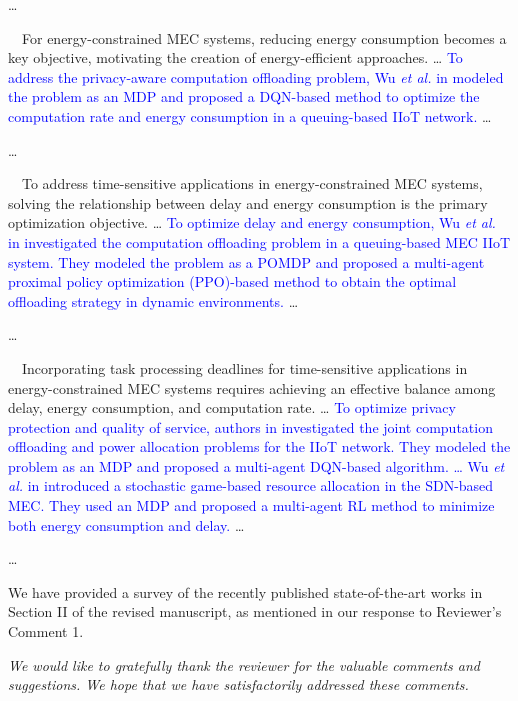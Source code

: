 \documentclass[12pt,draftclsnofoot,onecolumn]{IEEEtran}
\newcommand{\rev}[1]{{\color{blue}#1}} %
\newcommand{\rev}[1]{#1}
\newenvironment{my}[2]%
{\begin{list}{}%
{\setlength{\rightmargin}{#1}\setlength{\leftmargin}{#2}}%


 \item[]{}

} {\end{list}}
\begin{document}
\begin{enumerate}
	\begin{my}{1cm}{1cm}
		\rev{
			{
				\color{black}
				
				
				
				\dots
				
				\,\,\,\,
				For energy-constrained MEC systems, reducing energy consumption becomes a key objective, motivating the creation of energy-efficient approaches. \dots
				\textcolor{blue}{To address the privacy-aware computation offloading problem, Wu \textit{et al.} in \cite{wu2024combining} modeled the problem as an MDP and proposed a DQN-based method to optimize the computation rate and energy consumption in a queuing-based IIoT network.} \dots
				
				\dots
				
				\,\,\,\,
				To address time-sensitive applications in energy-constrained MEC systems, solving the relationship between delay and energy consumption is the primary optimization objective.  \dots
					\textcolor{blue}{To optimize delay and energy consumption, Wu \textit{et al.} in \cite{wu2023multi} investigated the computation offloading problem in a queuing-based MEC IIoT system. They modeled the problem as a POMDP and proposed a multi-agent proximal policy optimization (PPO)-based method to obtain the optimal offloading strategy in dynamic environments.} \dots
				
				\dots

				\,\,\,\,
				Incorporating task processing deadlines for time-sensitive applications in energy-constrained MEC systems requires achieving an effective balance among delay, energy consumption, and computation rate. \dots
					\textcolor{blue}{To optimize privacy protection and quality of service, authors in \cite{wu2024privacy} investigated the joint computation offloading and power allocation problems for the IIoT network. They modeled the problem as an MDP and proposed a multi-agent DQN-based algorithm. \dots
				Wu \textit{et al.} in \cite{wu2023computation} introduced a stochastic game-based resource allocation in the SDN-based MEC. They used an MDP and proposed a multi-agent RL method to minimize both energy consumption and delay.} \dots

				
				
				\dots
				
				
		}}
	\end{my}\vspace{5mm}

We have provided a survey of the recently published state-of-the-art works in Section II of the revised manuscript, as mentioned in our response to Reviewer's Comment 1.\newline


	
\end{enumerate}

\vspace{5mm}

\textit{We would like to gratefully thank the reviewer for the valuable comments and suggestions. We hope that we have satisfactorily addressed these comments.}
\end{document}
